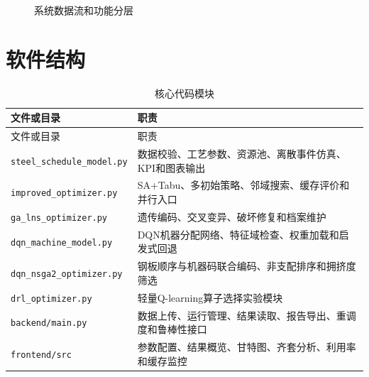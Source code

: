 \documentclass[UTF8,zihao=-4,openany]{ctexrep}
\newcommand{\code}[1]{\texttt{#1}}
\begin{document}
\begin{figure}[H]
\centering
{}
\caption{系统数据流和功能分层}
\end{figure}

\section{软件结构}

\small
\begin{longtable}{p{}p{}}
\caption{核心代码模块}\label{tab:code-map}\\
\toprule
文件或目录 & 职责 \\
\midrule
\endfirsthead
\toprule
文件或目录 & 职责 \\
\midrule
\endhead
\code{steel\_schedule\_model.py} & 数据校验、工艺参数、资源池、离散事件仿真、KPI和图表输出 \\
\code{improved\_optimizer.py} & SA+Tabu、多初始策略、邻域搜索、缓存评价和并行入口 \\
\code{ga\_lns\_optimizer.py} & 遗传编码、交叉变异、破坏修复和档案维护 \\
\code{dqn\_machine\_model.py} & DQN机器分配网络、特征域检查、权重加载和启发式回退 \\
\code{dqn\_nsga2\_optimizer.py} & 钢板顺序与机器码联合编码、非支配排序和拥挤度筛选 \\
\code{drl\_optimizer.py} & 轻量Q-learning算子选择实验模块 \\
\code{backend/main.py} & 数据上传、运行管理、结果读取、报告导出、重调度和鲁棒性接口 \\
\code{frontend/src} & 参数配置、结果概览、甘特图、齐套分析、利用率和缓存监控 \\
\bottomrule
\end{longtable}
\normalsize
\end{document}
